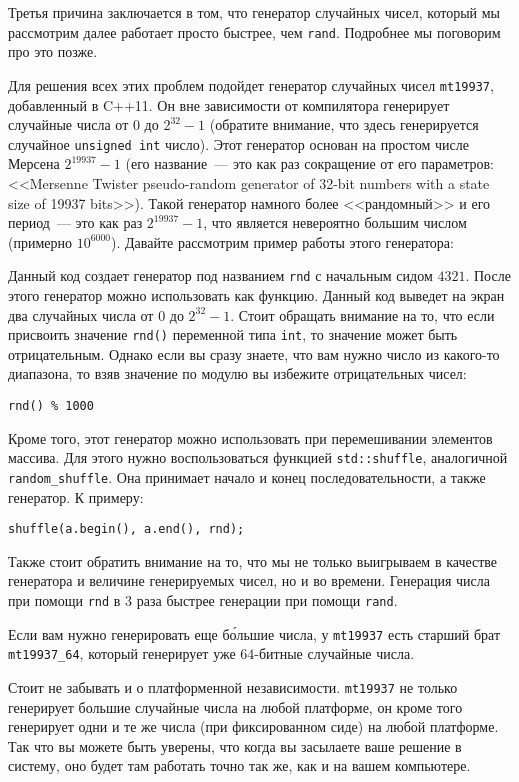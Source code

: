 Третья причина заключается в том, что генератор случайных чисел, который мы рассмотрим далее работает просто быстрее, чем \verb+rand+. Подробнее мы поговорим про это позже.

Для решения всех этих проблем подойдет генератор случайных чисел \verb+mt19937+, добавленный в C++11. Он вне зависимости от компилятора генерирует случайные числа от $0$ до $2^{32} - 1$ (обратите внимание, что здесь генерируется случайное \verb+unsigned int+ число). Этот генератор основан на простом числе Мерсена $2^{19937} - 1$ (его название~--- это как раз сокращение от его параметров: <<Mersenne Twister pseudo-random generator of 32-bit numbers with a state size of 19937 bits>>). Такой генератор намного более <<рандомный>> и его период~--- это как раз $2^{19937} - 1$, что является невероятно большим числом (примерно $10^{6000}$). Давайте рассмотрим пример работы этого генератора:



Данный код создает генератор под названием \verb+rnd+ с начальным сидом $4321$. После этого генератор можно использовать как функцию. Данный код выведет на экран два случайных числа от $0$ до $2^{32} - 1$. Стоит обращать внимание на то, что если присвоить значение \verb+rnd()+ переменной типа \verb+int+, то значение может быть отрицательным. Однако если вы сразу знаете, что вам нужно число из какого-то диапазона, то взяв значение по модулю вы избежите отрицательных чисел:

\verb+rnd() % 1000+

Кроме того, этот генератор можно использовать при перемешивании элементов массива. Для этого нужно воспользоваться функцией \verb+std::shuffle+, аналогичной \verb+random_shuffle+. Она принимает начало и конец последовательности, а также генератор. К примеру:

\verb+shuffle(a.begin(), a.end(), rnd);+

Также стоит обратить внимание на то, что мы не только выигрываем в качестве генератора и величине генерируемых чисел, но и во времени. Генерация числа при помощи \verb+rnd+ в $3$ раза быстрее генерации при помощи \verb+rand+.

Если вам нужно генерировать еще б\'{о}льшие числа, у \verb+mt19937+ есть старший брат \verb+mt19937_64+, который генерирует уже  $64$-битные случайные числа.

Стоит не забывать и о платформенной независимости. \verb+mt19937+ не только генерирует большие случайные числа на любой платформе, он кроме того генерирует одни и те же числа (при фиксированном сиде) на любой платформе. Так что вы можете быть уверены, что когда вы засылаете ваше решение в систему, оно будет там работать точно так же, как и на вашем компьютере.


